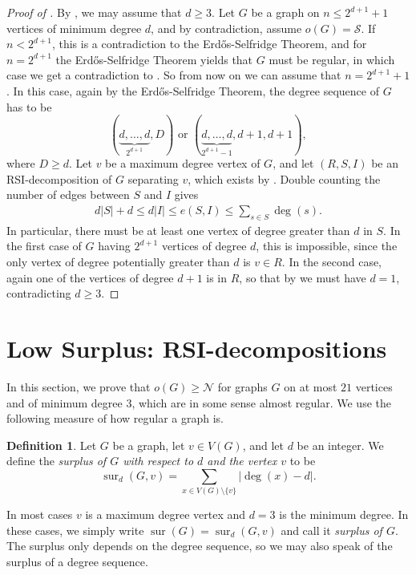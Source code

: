 \documentclass[a4paper,11pt,oneside]{scrartcl}
\theoremstyle{definition}
\newtheorem{definition}{Definition}
\theoremstyle{remark}
\DeclareMathOperator{\sur}{sur}
\newcommand{\surp}[3]{\sur_{#1}(#2,#3)}
\begin{document}
\plusone*
\begin{proof}[Proof of ]
    By , we may assume that $d \geq 3$. Let $G$ be a graph on $n \leq 2^{d+1}+1$ vertices of minimum degree $d$, and by contradiction, assume $o(G) = \mathcal S$. If $n < 2^{d+1}$, this is a contradiction to the Erd\H{o}s-Selfridge Theorem, and for $n=2^{d+1}$ the Erd\H{o}s-Selfridge Theorem yields that $G$ must be regular, in which case we get a contradiction to . So from now on we can assume that $n = 2^{d+1}+1$. In this case, again by the Erd\H{o}s-Selfridge Theorem, the degree sequence of $G$ has to be 
    \[(\underbrace{d,\dots,d}_{2^{d+1}},D) \text{ or } (\underbrace{d,\dots,d}_{2^{d+1}-1},d+1,d+1),\]
    where $D \geq d$. Let $v$ be a maximum degree vertex of $G$, and let $(R,S,I)$ be an RSI-decomposition of $G$ separating $v$, which exists by . Double counting the number of edges between $S$ and $I$ gives
    \begin{align}\label{align:double_counting}
        d|S| + d \leq d|I| \le e(S,I) \leq \sum_{s\in S} \deg(s).
    \end{align}
    In particular, there must be at least one vertex of degree greater than $d$ in $S$. In the first case of $G$ having $2^{d+1}$ vertices of degree $d$, this is impossible, since the only vertex of degree potentially greater than $d$ is $v \in R$. In the second case, again one of the vertices of degree $d+1$ is in $R$, so that by  we must have $d = 1$, contradicting $d \geq 3$.
\end{proof}

\section{Low Surplus: RSI-decompositions}\label{section:low_surplus}

In this section, we prove that $o(G) \geq \mathcal N$ for graphs $G$ on at most $21$ vertices and of minimum degree $3$, which are in some sense almost regular. We use the following measure of how regular a graph is. 
\begin{definition}\label{definition:surplus}
    Let $G$ be a graph, let $v\in V(G)$, and let $d$ be an integer.
    We define the \emph{surplus of $G$ with respect to $d$  and the vertex $v$} to be 
    \[\surp{d}{G}{v}=\sum_{x\in V(G)\setminus \{v\}} |\deg(x)-d|.\]
\end{definition}
In most cases $v$ is a maximum degree vertex and $d = 3$ is the minimum degree. In these cases, we simply write $\sur(G) = \surp{d}{G}{v}$ and call it \emph{surplus of $G$}. The surplus only depends on the degree sequence, so we may also speak of the surplus of a degree sequence.
\end{document}
